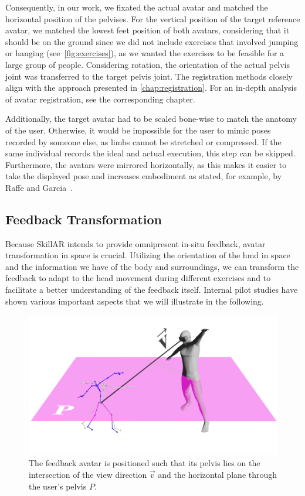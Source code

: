 Consequently, in our work, we fixated the actual avatar and matched the horizontal position of the pelvises. For the vertical position of the target reference avatar, we matched the lowest feet position of both avatars, considering that it should be on the ground since we did not include exercises that involved jumping or hanging (see~\autoref{fig:exercises}), as we wanted the exercises to be feasible for a large group of people. Considering rotation, the orientation of the actual pelvis joint was transferred to the target pelvis joint. The registration methods closely align with the approach presented in \autoref{chap:registration}. For an in-depth analysis of avatar registration, see the corresponding chapter.

Additionally, the target avatar had to be scaled bone-wise to match the anatomy of the user. Otherwise, it would be impossible for the user to mimic poses recorded by someone else, as limbs cannot be stretched or compressed. If the same individual records the ideal and actual execution, this step can be skipped. Furthermore, the avatars were mirrored horizontally, as this makes it easier to take the displayed pose and increases embodiment as stated, for example, by Raffe and Garcia~\cite{raffe2018combining}.

\subsection{Feedback Transformation \label{sec:transformation}}
Because SkillAR intends to provide omnipresent in-situ feedback, avatar transformation in space is crucial. Utilizing the orientation of the \acrshort{hmd} in space and the information we have of the body and surroundings, we can transform the feedback to adapt to the head movement during different exercises and to facilitate a better understanding of the feedback itself. Internal pilot studies have shown various important aspects that we will illustrate in the following.

\begin{figure}[tbh]
	\centering
	\includegraphics[width=0.6\linewidth]{pictures/avatarPos.png}
	\caption[Positioning of the feedback avatar.]{The feedback avatar is positioned such that its pelvis lies on the intersection of the view direction $\vec{v}$ and the horizontal plane through the user's pelvis $P$.\label{fig:positioning}}
\end{figure}

